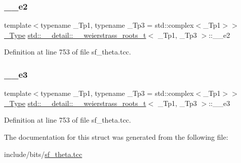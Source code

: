 \subsubsection{\texorpdfstring{\+\_\+\+\_\+e2}{\_\_e2}}
{\footnotesize\ttfamily template$<$typename \+\_\+\+Tp1, typename \+\_\+\+Tp3 = std\+::complex$<$\+\_\+\+Tp1$>$$>$ \\
\hyperlink{structstd_1_1____detail_1_1____weierstrass__roots__t_acda3e0386962aea322dea870977b67ed}{\+\_\+\+Type} \hyperlink{structstd_1_1____detail_1_1____weierstrass__roots__t}{std\+::\+\_\+\+\_\+detail\+::\+\_\+\+\_\+weierstrass\+\_\+roots\+\_\+t}$<$ \+\_\+\+Tp1, \+\_\+\+Tp3 $>$\+::\+\_\+\+\_\+e2}



Definition at line 753 of file sf\+\_\+theta.\+tcc.

\mbox{\label{structstd_1_1____detail_1_1____weierstrass__roots__t_ace1c2bcb3e385eee959955ea4e4d9f11}} 
\subsubsection{\texorpdfstring{\+\_\+\+\_\+e3}{\_\_e3}}
{\footnotesize\ttfamily template$<$typename \+\_\+\+Tp1, typename \+\_\+\+Tp3 = std\+::complex$<$\+\_\+\+Tp1$>$$>$ \\
\hyperlink{structstd_1_1____detail_1_1____weierstrass__roots__t_acda3e0386962aea322dea870977b67ed}{\+\_\+\+Type} \hyperlink{structstd_1_1____detail_1_1____weierstrass__roots__t}{std\+::\+\_\+\+\_\+detail\+::\+\_\+\+\_\+weierstrass\+\_\+roots\+\_\+t}$<$ \+\_\+\+Tp1, \+\_\+\+Tp3 $>$\+::\+\_\+\+\_\+e3}



Definition at line 753 of file sf\+\_\+theta.\+tcc.



The documentation for this struct was generated from the following file\+:\begin{DoxyCompactItemize}
\item 
include/bits/\hyperlink{sf__theta_8tcc}{sf\+\_\+theta.\+tcc}\end{DoxyCompactItemize}

